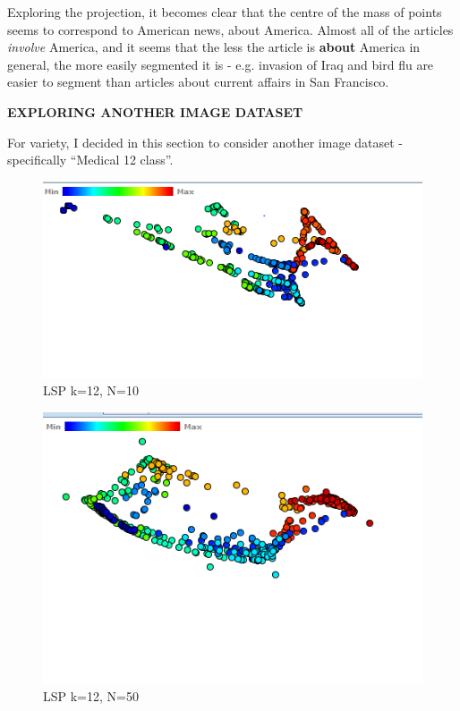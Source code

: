 \documentclass[ 10pt ]{fphw}
\begin{document}
Exploring the projection, it becomes clear that the centre of the mass of points seems to correspond to American news, about America. Almost all of the articles \textit{involve} America, and it seems that the less the article is \textbf{about} America in general, the more easily segmented it is - e.g. invasion of Iraq and bird flu are easier to segment than articles about current affairs in San Francisco.


\vspace{1cm}

\textbf{EXPLORING ANOTHER IMAGE DATASET}

\vspace{1cm}

For variety, I decided in this section to consider another image dataset - specifically ``Medical  12 class''.

\begin{center}
\begin{figure}[H]
    \centering
	\includegraphics[width=0.65\columnwidth]{task2d/medLSP12-10.PNG}
	\caption{LSP k=12, N=10}
	\label{fig:med1210}
	\end{figure}
\end{center}

\begin{center}
\begin{figure}[H]
    \centering
	\includegraphics[width=0.65\columnwidth]{task2d/medLSP12-50.PNG}
	\caption{LSP k=12, N=50}
	\label{fig:med1250}
	\end{figure}
\end{center}
\end{document}
